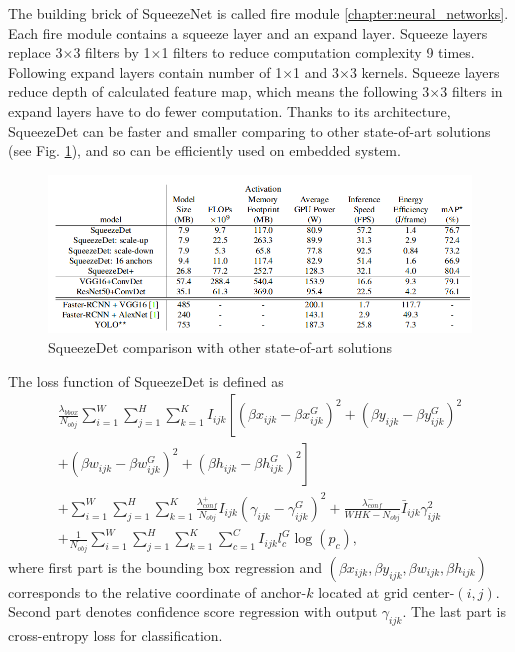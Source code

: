 \documentclass[twoside]{ctuthesis}
\theoremstyle{plain}
\theoremstyle{definition}
\theoremstyle{note}
\begin{document}
The building brick of SqueezeNet is called fire module \ref{chapter:neural_networks}. Each fire module contains a squeeze layer and an expand layer. Squeeze layers replace 3$\times$3 filters by 1$\times$1 filters to reduce computation complexity 9 times. Following expand layers contain number of 1$\times$1  and 3$\times$3 kernels.    Squeeze layers reduce depth of calculated feature map, which means the following 3$\times$3 filters in expand layers have to do fewer computation. Thanks to its architecture, SqueezeDet can be faster and smaller comparing to other state-of-art solutions (see Fig. \ref{squeezedet_comparasion}), and so can be efficiently used on embedded system. 

\begin{figure}[H]
\caption{SqueezeDet comparison with other state-of-art solutions\cite{wu_iandola_jin_keutzer_2017}}
\label{squeezedet_comparasion}
\includegraphics[width=\textwidth]{images/used_networks/squeezedet_comparation.png}
\end{figure}
The loss function of SqueezeDet is defined as
\begin{multline}
\frac{\lambda_{bbox}}{N_{obj}}\sum_{i=1}^W\sum_{j=1}^H\sum_{k=1}^KI_{ijk}\left[\left(\beta x_{ijk}-\beta x_{ijk}^G\right)^2+\left(\beta y_{ijk} - \beta y_{ijk}^G\right)^2\right. \\
+\left(\beta w_{ijk}-\beta w_{ijk}^G\right)^2 + \left(\beta h_{ijk}-\beta h_{ijk}^G\right)^2\left. \right]\\
+\sum_{i=1}^W\sum_{j=1}^H\sum_{k=1}^K\frac{\lambda^{+}_{conf}}{N_{obj}}I_{ijk}\left(\gamma_{ijk}-\gamma_{ijk}^G\right)^2 + \frac{\lambda^{-}_{conf}}{WHK-N_{obj}}\bar{I}_{ijk}\gamma^2_{ijk}\\
+\frac{1}{N_{obj}}\sum_{i=1}^W\sum_{j=1}^H\sum_{k=1}^K\sum_{c=1}^CI_{ijk}l_c^G\log(p_c),
\end{multline}
where first part is the bounding box regression and $\left(\beta x_{ijk}, \beta y_{ijk}, \beta w_{ijk}, \beta h_{ijk}\right)$ corresponds to the relative coordinate of anchor-$k$ located at grid center-$(i,j)$. Second part denotes confidence score regression with output $\gamma_{ijk}$. The last part is cross-entropy   loss for classification.
\end{document}
